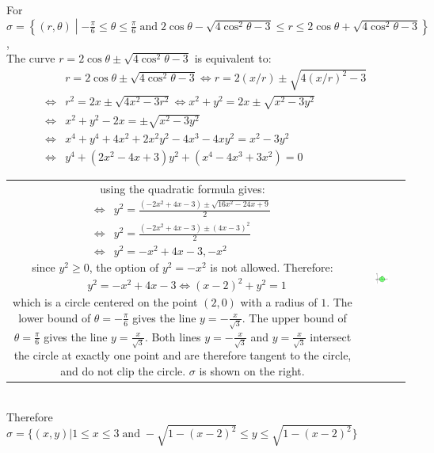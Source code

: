 \documentclass{article}
\newcommand{\dr}[1]{\textcolor{dark_red}{#1}}
\begin{document}
\pagebreak

\dr{\begin{framed}
For \(\sigma = \left\{(r,\theta) \middle| -\frac{\pi}{6} \leq \theta \leq \frac{\pi}{6} \;\text{and}\; 2\cos\theta - \sqrt{4\cos^2\theta - 3} \leq r \leq 2\cos\theta + \sqrt{4\cos^2\theta - 3}\right\}\), \\
The curve \(r = 2\cos\theta \pm \sqrt{4\cos^2\theta - 3}\) is equivalent to:
\begin{align*}
& r = 2\cos\theta \pm \sqrt{4\cos^2\theta - 3} 
\iff r = 2(x/r) \pm \sqrt{4(x/r)^2 - 3} \\
\iff & r^2 = 2x \pm \sqrt{4x^2 - 3r^2} 
\iff x^2 + y^2 = 2x \pm \sqrt{x^2 - 3y^2} \\
\iff & x^2 + y^2 - 2x = \pm \sqrt{x^2 - 3y^2} \\
\iff & x^4 + y^4 + 4x^2 + 2x^2y^2 - 4x^3 - 4xy^2 = x^2 - 3y^2 \\
\iff & y^4 + (2x^2 - 4x + 3)y^2 + (x^4 - 4x^3 + 3x^2) = 0 
\end{align*}
\begin{tabular}{cc}
\parbox{0.6\textwidth}{
using the quadratic formula gives:
\begin{align*}
\iff & y^2 = \frac{(-2x^2 + 4x - 3) \pm \sqrt{16x^2 - 24x + 9}}{2} \\
\iff & y^2 = \frac{(-2x^2 + 4x - 3) \pm (4x - 3)^2}{2} \\
\iff & y^2 = -x^2 + 4x - 3, -x^2
\end{align*}
since \(y^2 \geq 0\), the option of \(y^2 = -x^2\) is not allowed. Therefore:
\begin{align*}
& y^2 = -x^2 + 4x - 3 
\iff (x - 2)^2 + y^2 = 1
\end{align*}
which is a circle centered on the point \((2,0)\) with a radius of \(1\). The lower bound of \(\theta = -\frac{\pi}{6}\) gives the line \(y = -\frac{x}{\sqrt{3}}\). The upper bound of \(\theta = \frac{\pi}{6}\) gives the line \(y = \frac{x}{\sqrt{3}}\). Both lines \(y = -\frac{x}{\sqrt{3}}\) and \(y = \frac{x}{\sqrt{3}}\) intersect the circle at exactly one point and are therefore tangent to the circle, and do not clip the circle. \(\sigma\) is shown on the right.
} & \parbox{0.4\textwidth}{
\includegraphics[width = 0.4\textwidth]{Test_bench_part_3x_images/Test_bench_part_3x_Solutions_image_12}
}
\end{tabular} \\
Therefore \(\sigma = \{(x,y) | 1 \leq x \leq 3 \;\text{and}\; -\sqrt{1 - (x-2)^2} \leq y \leq \sqrt{1 - (x-2)^2}\}\)
\end{framed}}
\end{document}
